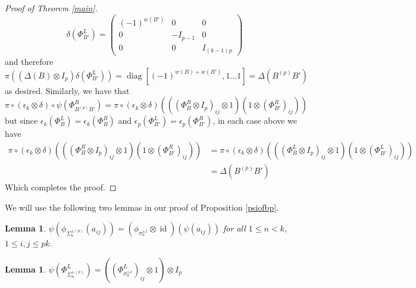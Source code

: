 \documentclass[11pt]{amsart}
\def\s{{\sigma}}
\newcommand\id{\operatorname{id}}
\newcommand\diag{\operatorname{diag}}
\newcommand\SpPm{\Sigma^{\pm(p)}}
\newtheorem{lem}[thm]{Lemma}
\begin{document}
\begin{proof}[Proof of Theorem \ref{main}]
$$\delta\left(\Phi_{B'}^L\right) = 
\left( \begin{array}{ccc}
(-1)^{w(B')} & 0 & 0 \\
0 & -I_{p-1} & 0 \\
0 & 0 & I_{(k-1)p} \end{array} \right)
$$
\noindent and therefore
$$
\pi\left(\left(\Delta(B)\otimes I_p\right)\delta\left(\Phi_{B'}^L\right)\right)= \diag[(-1)^{w(B) + w(B')},1\ldots 1] = \Delta(B^{(p)}B')
$$
\noindent as desired.  Similarly, we have that
$$
\pi\circ(\epsilon_k\otimes\delta)\circ\psi\left(\Phi_{B^{(p)}B'}^R\right) = \pi\circ(\epsilon_k\otimes\delta)\left(\left(\left(\Phi_B^R\otimes I_p\right)_{ij}\otimes 1\right)\left(1\otimes \left(\Phi_{B'}^R\right)_{ij}\right)\right)
$$
but since $\epsilon_k\left(\Phi_B^L\right) = \epsilon_k\left(\Phi_B^R\right)$ and $\epsilon_p\left(\Phi_{B'}^L\right) = \epsilon_p\left(\Phi_{B'}^R\right)$, in each case above we have
\begin{align*}
\pi\circ(\epsilon_k\otimes\delta)\left(\left(\left(\Phi_B^R\otimes I_p\right)_{ij}\otimes 1\right)\left(1\otimes \left(\Phi_{B'}^R\right)_{ij}\right)\right) &= \pi\circ(\epsilon_k\otimes\delta)\left(\left(\left(\Phi_B^L\otimes I_p\right)_{ij}\otimes 1\right)\left(1\otimes \left(\Phi_{B'}^L\right)_{ij}\right)\right)\\
&= \Delta\left(B^{(p)}B'\right)
\end{align*}
Which completes the proof.
\end{proof}


\noindent We will use the following two lemmas in our proof of Proposition \ref{psiofbp}.


\begin{lem}\label{commutes}
$\psi(\phi_{\SpPm_n}(a_{ij})) = (\phi_{\s_n^{\pm 1}} \otimes \id)(\psi(a_{ij}))$ for all $1\le n < k$, $1 \le i,j \le pk$.
\end{lem}

\begin{lem}\label{basecase}
$\psi\left(\Phi_{\SpPm_n}^L\right) = \left(\left(\Phi_{\s_n^{\pm 1}}^L\right)_{ij}\otimes 1\right)\otimes I_p$
\end{lem}
\end{document}
